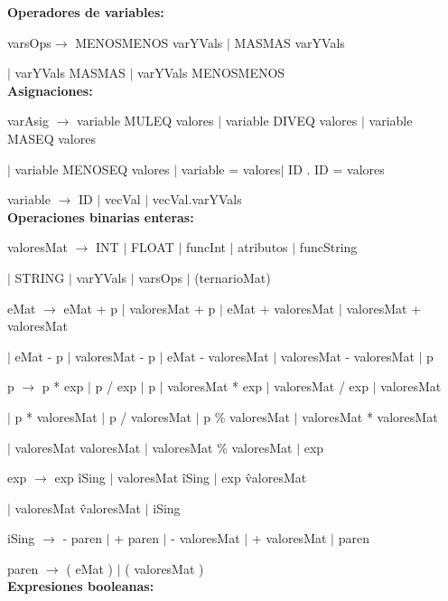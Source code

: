 \textbf{Operadores de variables:}

varsOps$\rightarrow$ MENOSMENOS varYVals $|$ MASMAS varYVals

\hspace{15mm}$|$ varYVals MASMAS $|$ varYVals MENOSMENOS \\


\textbf{Asignaciones:} 

  varAsig $\rightarrow$ variable MULEQ valores $|$ variable DIVEQ valores $|$ variable MASEQ valores
  
  \hspace{15mm}$|$ variable MENOSEQ valores $|$ variable = valores$|$ ID . ID = valores 


variable $\rightarrow$ ID $|$ vecVal $|$ vecVal.varYVals  \\


\textbf{Operaciones binarias enteras:} 

 valoresMat $\rightarrow$ INT $|$ FLOAT $|$ funcInt $|$ atributos $|$ funcString
 
  \hspace{15mm} $|$ STRING $|$ varYVals $|$ varsOps $|$ (ternarioMat)  
  
 
eMat $\rightarrow$ eMat + p $|$ valoresMat + p $|$ eMat + valoresMat $|$ valoresMat + valoresMat
  
  \hspace{15mm} $|$ eMat - p  $|$ valoresMat - p  $|$ eMat - valoresMat $|$ valoresMat - valoresMat $|$ p
  
 p $\rightarrow$ p * exp $|$ p / exp $|$ p  $|$ valoresMat * exp $|$ valoresMat / exp $|$ valoresMat 
 
   \hspace{15mm} $|$ p * valoresMat $|$ p / valoresMat $|$ p \% valoresMat $|$ valoresMat * valoresMat
   
   \hspace{15mm} $|$ valoresMat \/ valoresMat $|$ valoresMat \% valoresMat $|$ exp
    
 exp $\rightarrow$ exp \^ iSing $|$ valoresMat \^ iSing $|$ exp \^ valoresMat
 
 \hspace{15mm} $|$ valoresMat \^ valoresMat $|$ iSing
  
iSing $\rightarrow$ - paren $|$ + paren $|$ - valoresMat $|$ + valoresMat $|$ paren
  
  
 paren $\rightarrow$ ( eMat )  $|$ ( valoresMat ) \\
  
  
\textbf{Expresiones booleanas:} 

